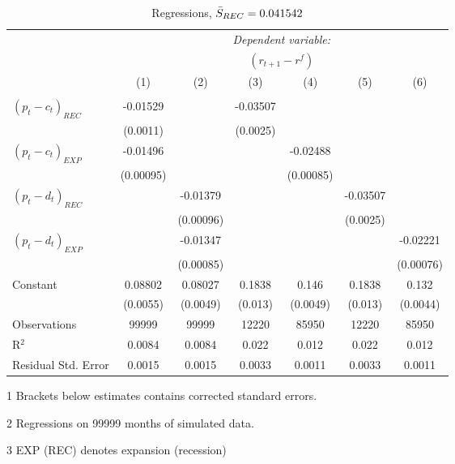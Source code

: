 \begin{table}[H]
\centering
  \caption{Regressions, $\Bar{S}_{REC} = 0.041542$}
  \label{tab:regress1}
  \begin{threeparttable}
\begin{tabular}{@{\hspace{5pt}}l@{\hspace{5pt}}cccccc}
\toprule
 & \multicolumn{6}{c}{\textit{Dependent variable:}} \\
 & \multicolumn{6}{c}{$\left(r_{t+1}-r^f\right)$} \\
 \cmidrule(rr){2-7}
 & (1) & (2) & (3) & (4) & (5) & (6) \\
\midrule
\\[-2.1ex] $\left( p_t - c_t \right)_{REC}$ &-0.01529& &-0.03507 & & &\\
  & (0.0011) & &(0.0025) & & & \\
 \addlinespace
  $\left( p_t - c_t \right)_{EXP}$ &-0.01496  &    & &-0.02488 & &  \\
  & (0.00095) & & &(0.00085) & & \\
 \addlinespace
  $\left( p_t - d_t \right)_{REC}$ & &-0.01379& & & -0.03507  &   \\
                                   & &  (0.00096) & & & (0.0025) &    \\
 \addlinespace
  $\left( p_t - d_t \right)_{EXP}$ & &   -0.01347& & & &-0.02221 \\
                                   & &  (0.00085) & & & &(0.00076) \\
 \addlinespace
 Constant &0.08802 &0.08027&0.1838 &0.146 &0.1838 &0.132 \\
          &(0.0055) &(0.0049)&(0.013)&(0.0049)&(0.013)&(0.0044) \\
 \addlinespace
\midrule
Observations & 99999 & 99999&12220 & 85950&12220&85950\\
R$^{2}$ &0.0084 & 0.0084&0.022&0.012&0.022&0.012 \\
Residual Std. Error &0.0015 & 0.0015&0.0033&0.0011&0.0033&0.0011 \\
\bottomrule
\end{tabular}
\begin{tablenotes}
\footnotesize{
\item[1] Brackets below estimates contains \citet{NW87} corrected standard errors.
\item[2] Regressions on 99999 months of simulated data.
\item[3] EXP (REC) denotes expansion (recession)
}
\end{tablenotes}
\end{threeparttable}
\end{table}
